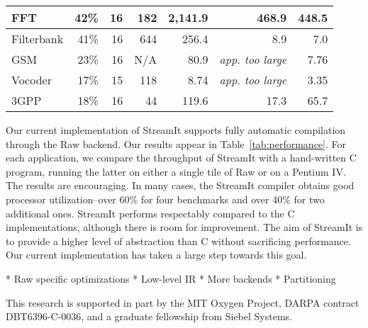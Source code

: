 \begin{table*}[t]
\begin{center}
\begin{tabular}{|l||r|r|r|r||r||r||}
FFT    & 42\% & 16  & 182 &  2,141.9 & 468.9 & 448.5  \\ \hline
Filterbank & 
       41\% & 16  &  644 &   256.4  & 8.9 & 7.0   \\ \hline
GSM    & 23\% & 16 & N/A &    80.9  & {\it app. too large} & 7.76 \\ \hline
Vocoder& 17\% & 15  & 118 &     8.74  & {\it app. too large} & 3.35  \\ \hline
3GPP   & 18\% & 16  & 44 &   119.6  & 17.3  & 65.7   \\ \hline \hline
\end{tabular}
\vspace{-6pt}
\caption{\protect\small Performance Results.}
\label{tab:performance}
\end{center}
\vspace{-12pt}
\end{table*}

Our current implementation of StreamIt supports fully automatic
compilation through the Raw backend.  Our results appear in
Table~\ref{tab:performance}.
For each application, we compare the throughput of StreamIt with a
hand-written C program, running the latter on either a single tile of
Raw or on a Pentium IV.
The results are encouraging.  In many cases, the StreamIt compiler
obtains good processor utilization--over 60\% for four benchmarks and
over 40\% for two additional ones.
StreamIt performs respectably compared to the C implementations,
although there is room for improvement.  The aim of StreamIt is to
provide a higher level of abstraction than C without sacrificing
performance.  Our current implementation has taken a large step
towards this goal.

* Raw specific optimizations
* Low-level IR
* More backends
* Partitioning

This research is supported in part by the MIT Oxygen Project, DARPA
contract DBT6396-C-0036, and a graduate fellowship from Siebel Systems.

